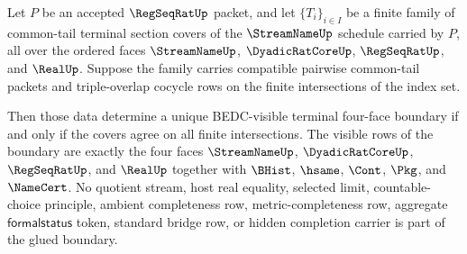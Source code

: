 \begin{theorem}
\label{thm:regseqrat-common-tail-terminal-four-face-sheaf-exactness}
Let $P$ be an accepted $\RegSeqRatUp$ packet, and let $\{T_i\}_{i \in I}$ be a finite family of common-tail terminal section covers of the $\StreamNameUp$ schedule carried by $P$, all over the ordered faces $\StreamNameUp$, $\DyadicRatCoreUp$, $\RegSeqRatUp$, and $\RealUp$. Suppose the family carries compatible pairwise common-tail packets and triple-overlap cocycle rows on the finite intersections of the index set.

Then those data determine a unique BEDC-visible terminal four-face boundary if and only if the covers agree on all finite intersections. The visible rows of the boundary are exactly the four faces $\StreamNameUp$, $\DyadicRatCoreUp$, $\RegSeqRatUp$, and $\RealUp$ together with $\BHist$, $\hsame$, $\Cont$, $\Pkg$, and $\NameCert$. No quotient stream, host real equality, selected limit, countable-choice principle, ambient completeness row, metric-completeness row, aggregate $\mathsf{formalstatus}$ token, standard bridge row, or hidden completion carrier is part of the glued boundary.
\end{theorem}
